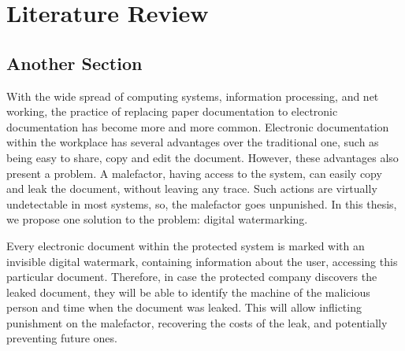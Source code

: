 \usepackage{blindtext}
\usepackage{graphicx}


\chapter{Literature Review}
\label{ch:lr}


\Blindtext[2]


\section{Another Section}\label{sec:another-section}
\Blindtext[1]
\newpage
With the wide spread of computing systems, information processing, and net working, the practice of replacing paper documentation to electronic documentation has become more and more common. Electronic documentation within the workplace has several advantages over the traditional one, such as being easy to share, copy and edit the document. However, these advantages also present a problem. A malefactor, having access to the system, can easily copy and leak the document, without leaving any trace. Such actions are virtually undetectable in most systems, so, the malefactor goes unpunished. In this thesis, we propose one solution to the problem: digital watermarking.

Every electronic document within the protected system is marked with an invisible digital watermark, containing information about the user, accessing this particular document. Therefore, in case the protected company discovers the leaked document, they will be able to identify the machine of the malicious person and time when the document was leaked. This will allow inflicting punishment on the malefactor, recovering the costs of the leak, and potentially preventing future ones.

